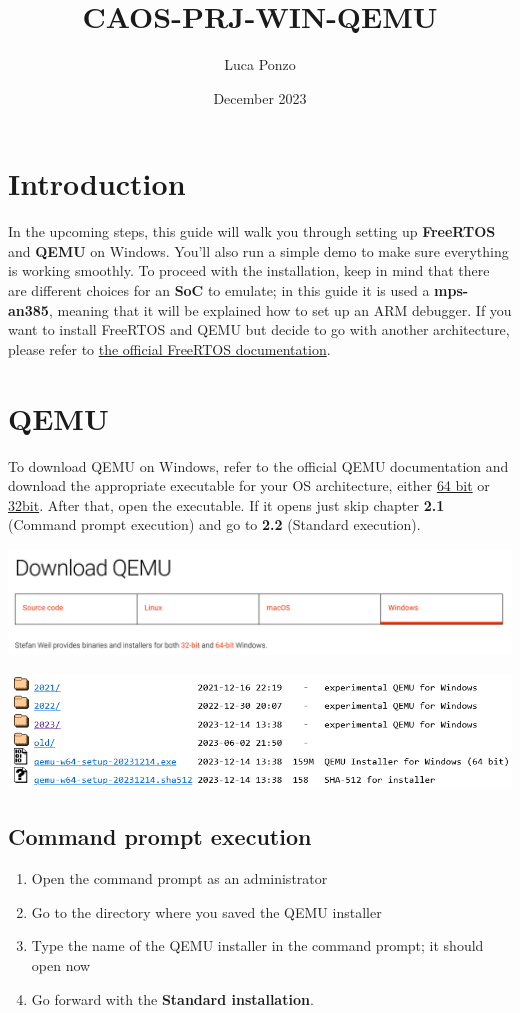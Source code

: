 \documentclass{article}
\title{CAOS-PRJ-WIN-QEMU}
\author{Luca Ponzo}
\date{December 2023}
\begin{document}
\maketitle

\section{Introduction}

In the upcoming steps, this guide will walk you through setting up \textbf{FreeRTOS} and \textbf{QEMU} on Windows. You'll also run a simple demo to make sure everything is working smoothly. To proceed with the installation, keep in mind that there are different choices for an \textbf{SoC} to emulate; in this guide it is used a \textbf{mps-an385}, meaning that it will be explained how to set up an ARM debugger. If you want to install FreeRTOS and QEMU but decide to go with another architecture, please refer to \href{https://www.freertos.org/a00090.html}{the official FreeRTOS documentation}.

\section{QEMU}

To download QEMU on Windows, refer to the official QEMU documentation and download the appropriate executable for your OS architecture, either \href{https://qemu.weilnetz.de/w64/}{64 bit} or \href{https://qemu.weilnetz.de/w32/}{32bit}. After that, open the executable. If it opens just skip chapter \textbf{2.1} (Command prompt execution) and go to \textbf{2.2} (Standard execution).

\includegraphics[width=\textwidth]{1a}

\includegraphics[width=\textwidth]{1b}

\subsection {Command prompt execution}
\begin{enumerate}
    \item Open the command prompt as an administrator
    \item Go to the directory where you saved the QEMU installer
    \item Type the name of the QEMU installer in the command prompt; it should open now
    \item Go forward with the \textbf{Standard installation}.
\end{enumerate}
\end{document}

